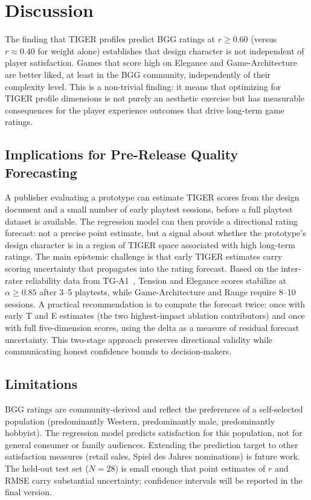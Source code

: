 \section{Discussion}
\label{sec:discussion}

The finding that TIGER profiles predict BGG ratings at $r \geq 0.60$ (versus $r \approx 0.40$
for weight alone) establishes that design character is not independent of player satisfaction.
Games that score high on Elegance and Game-Architecture are better liked, at least in
the BGG community, independently of their complexity level. This is a non-trivial finding:
it means that optimizing for TIGER profile dimensions is not purely an aesthetic exercise
but has measurable consequences for the player experience outcomes that drive long-term
game ratings.

\subsection{Implications for Pre-Release Quality Forecasting}

A publisher evaluating a prototype can estimate TIGER scores from the design document and
a small number of early playtest sessions, before a full playtest dataset is available.
The regression model can then provide a directional rating forecast: not a precise point
estimate, but a signal about whether the prototype's design character is in a region of
TIGER space associated with high long-term ratings. The main epistemic challenge is that
early TIGER estimates carry scoring uncertainty that propagates into the rating forecast.
Based on the inter-rater reliability data from TG-A1~\cite{dellaLibera2026corpus},
Tension and Elegance scores stabilize at $\alpha \geq 0.85$ after 3--5 playtests, while
Game-Architecture and Range require 8--10 sessions. A practical recommendation is to
compute the forecast twice: once with early T and E estimates (the two highest-impact
ablation contributors) and once with full five-dimension scores, using the delta as a
measure of residual forecast uncertainty. This two-stage approach preserves directional
validity while communicating honest confidence bounds to decision-makers.

\subsection{Limitations}

BGG ratings are community-derived and reflect the preferences of a self-selected population
(predominantly Western, predominantly male, predominantly hobbyist). The regression model
predicts satisfaction for this population, not for general consumer or family audiences.
Extending the prediction target to other satisfaction measures (retail sales, Spiel des
Jahres nominations) is future work. The held-out test set ($N = 28$) is small enough
that point estimates of $r$ and RMSE carry substantial uncertainty; confidence intervals
will be reported in the final version.
